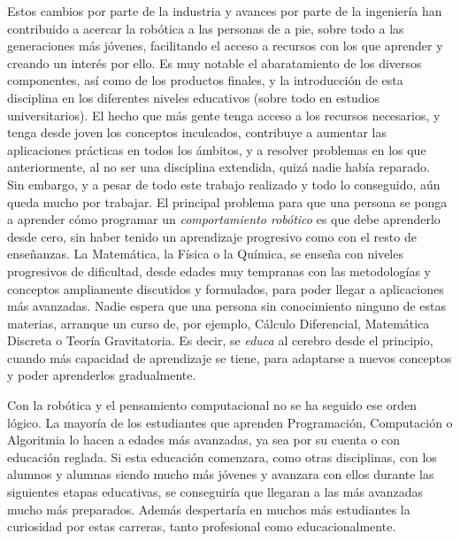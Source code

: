 Estos cambios por parte de la industria y avances por parte de la ingeniería han contribuido a acercar la robótica a las personas de a pie, sobre todo a las generaciones más jóvenes, facilitando el acceso a recursos con los que aprender y creando un interés por ello. Es muy notable el abaratamiento de los diversos componentes, así como de los productos finales, y la introducción de esta disciplina en los diferentes niveles educativos (sobre todo en estudios universitarios). El hecho que más gente tenga acceso a los recursos necesarios, y tenga desde joven los conceptos inculcados, contribuye a aumentar las aplicaciones prácticas en todos los ámbitos, y a resolver problemas en los que anteriormente, al no ser una disciplina extendida, quizá nadie había reparado. \\

Sin embargo, y a pesar de todo este trabajo realizado y todo lo conseguido, aún queda mucho por trabajar. El principal problema para que una persona se ponga a aprender cómo programar un \textit{comportamiento robótico} es que debe aprenderlo desde cero, sin haber tenido un aprendizaje progresivo como con el resto de enseñanzas. La Matemática, la Física o la Química, se enseña con niveles progresivos de dificultad, desde edades muy tempranas con las metodologías y conceptos ampliamente discutidos y formulados, para poder llegar a aplicaciones más avanzadas. Nadie espera que una persona sin conocimiento ninguno de estas materias, arranque  un curso de, por ejemplo, Cálculo Diferencial, Matemática Discreta o Teoría Gravitatoria. Es decir, se \textit{educa} al cerebro desde el principio, cuando más capacidad de aprendizaje se tiene, para adaptarse a nuevos conceptos y poder aprenderlos gradualmente. \\
\par Con la robótica y el pensamiento computacional no se ha seguido ese orden lógico. La mayoría de los estudiantes que aprenden Programación, Computación o Algoritmia lo hacen a edades más avanzadas, ya sea por su cuenta o con educación reglada. Si esta educación comenzara, como otras disciplinas, con los alumnos y alumnas siendo mucho más jóvenes y avanzara con ellos durante las siguientes etapas educativas, se conseguiría que llegaran a las más avanzadas mucho más preparados. Además despertaría en muchos más estudiantes la curiosidad por estas carreras, tanto profesional como educacionalmente.\\

